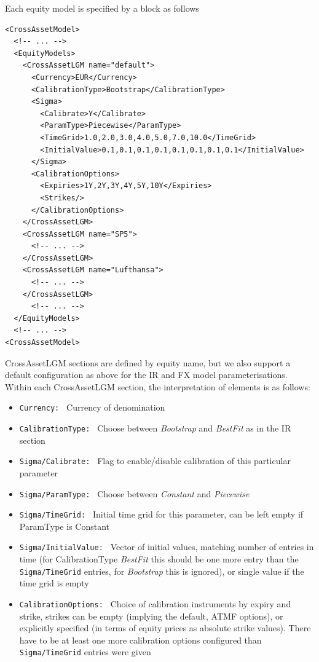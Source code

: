 \medskip

Each equity model is specified by a block as follows

\begin{listing}[H]
\begin{verbatim}
<CrossAssetModel>
  <!-- ... -->
  <EquityModels>
    <CrossAssetLGM name="default">
      <Currency>EUR</Currency>
      <CalibrationType>Bootstrap</CalibrationType>
      <Sigma>
        <Calibrate>Y</Calibrate>
        <ParamType>Piecewise</ParamType>
        <TimeGrid>1.0,2.0,3.0,4.0,5.0,7.0,10.0</TimeGrid>
        <InitialValue>0.1,0.1,0.1,0.1,0.1,0.1,0.1,0.1</InitialValue>
      </Sigma>
      <CalibrationOptions>
        <Expiries>1Y,2Y,3Y,4Y,5Y,10Y</Expiries>
        <Strikes/>
      </CalibrationOptions>
    </CrossAssetLGM>
    <CrossAssetLGM name="SP5">
      <!-- ... -->
    </CrossAssetLGM>
    <CrossAssetLGM name="Lufthansa">
      <!-- ... -->
    </CrossAssetLGM>
      <!-- ... -->
  </EquityModels>
  <!-- ... -->
<CrossAssetModel>
\end{verbatim}
\caption{Simulation model equity configuration}
\label{lst:simulation_model_eq_configuration}
\end{listing}

CrossAssetLGM sections are defined by equity name, but we also support a default configuration as above for the IR and
FX model parameterisations.  Within each CrossAssetLGM section, the interpretation of elements is as follows:

\begin{itemize}
	\item {\tt Currency: } Currency of denomination
	\item {\tt CalibrationType: } Choose between {\em Bootstrap} and {\em BestFit} as in the IR section
	\item {\tt Sigma/Calibrate: } Flag to enable/disable calibration of this particular parameter
	\item {\tt Sigma/ParamType: } Choose between {\em Constant} and {\em Piecewise}
	\item {\tt Sigma/TimeGrid: } Initial time grid for this parameter, can be left empty if ParamType is Constant
	\item {\tt Sigma/InitialValue: } Vector of initial values, matching number of entries in time (for CalibrationType {\em BestFit} this should be one more entry than the {\tt Sigma/TimeGrid} entries, for {\em Bootstrap} this is ignored), or single value if the time grid is empty
	\item {\tt CalibrationOptions: } Choice of calibration instruments by expiry and strike, strikes can be empty
	(implying the default, ATMF options), or explicitly specified (in terms of equity prices as absolute strike values). There have to be at least one more calibration options configured than {\tt Sigma/TimeGrid} entries were given
\end{itemize}

